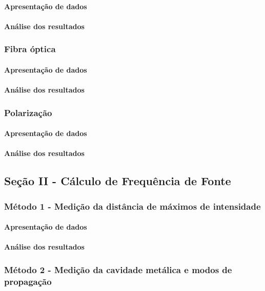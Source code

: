 \documentclass[12pt]{article}
\begin{document}
\paragraph{Apresentação de dados}
\paragraph{Análise dos resultados}

\subsubsection{Fibra óptica}
\paragraph{Apresentação de dados}
\paragraph{Análise dos resultados}

\subsubsection{Polarização}
\paragraph{Apresentação de dados}
\paragraph{Análise dos resultados}

\subsection{Seção II - Cálculo de Frequência de Fonte}
\subsubsection{Método 1 - Medição da distância de máximos de intensidade}
\paragraph{Apresentação de dados}
\paragraph{Análise dos resultados}

\subsubsection{Método 2 - Medição da cavidade metálica e modos de propagação}
\end{document}
